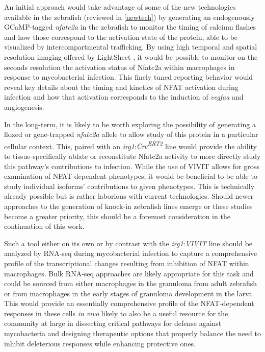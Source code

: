 An initial approach would take advantage of some of the new technologies available in the zebrafish (reviewed in \autoref{newtech}) by generating an endogenously GCaMP\hyp{}tagged \textit{nfatc2a} in the zebrafish to monitor the timing of calcium flashes and how those correspond to the activation state of the protein, able to be visualized by intercompartmental trafficking. By using high temporal and spatial resolution imaging offered by LightSheet \citep{Reynaud2008}, it would be possible to monitor on the seconds resolution the activation status of Nfatc2a within macrophages in response to mycobacterial infection. This finely tuned reporting behavior would reveal key details about the timing and kinetics of NFAT activation during infection and how that activation corresponds to the induction of \textit{vegfaa} and angiogenesis.

In the long\hyp{}term, it is likely to be worth exploring the possibility of generating a floxed or gene-trapped \textit{nfatc2a} allele to allow study of this protein in a particular cellular context. This, paired with an \textit{irg1}:\textit{Cre\textsuperscript{ERT2}} line would provide the ability to tissue-specifically ablate or reconstitute Nfatc2a activity to more directly study this pathway's contributions to infection. While the use of VIVIT allows for gross examination of NFAT\hyp{}dependent phenotypes, it would be beneficial to be able to study individual isoforms' contributions to given phenotypes. This is technically already possible but is rather laborious with current technologies. Should newer approaches to the generation of knock\hyp{}in zebrafish lines emerge or these studies become a greater priority, this should be a foremost consideration in the continuation of this work.

Such a tool either on its own or by contrast with the \textit{irg1}:\textit{VIVIT} line should be analyzed by RNA\hyp{}seq during mycobacterial infection to capture a comprehensive profile of the transcriptional changes resulting from inhibition of NFAT within macrophages. Bulk RNA\hyp{}seq approaches are likely appropriate for this task and could be sourced from either macrophages in the granuloma from adult zebrafish or from macrophages in the early stages of granuloma development in the larva. This would provide an essentially comprehensive profile of the NFAT\hyp{}dependent responses in these cells \textit{in vivo} likely to also be a useful resource for the community at large in dissecting critical pathways for defense against mycobacteria and designing therapeutic options that properly balance the need to inhibit deleterious responses while enhancing protective ones.

